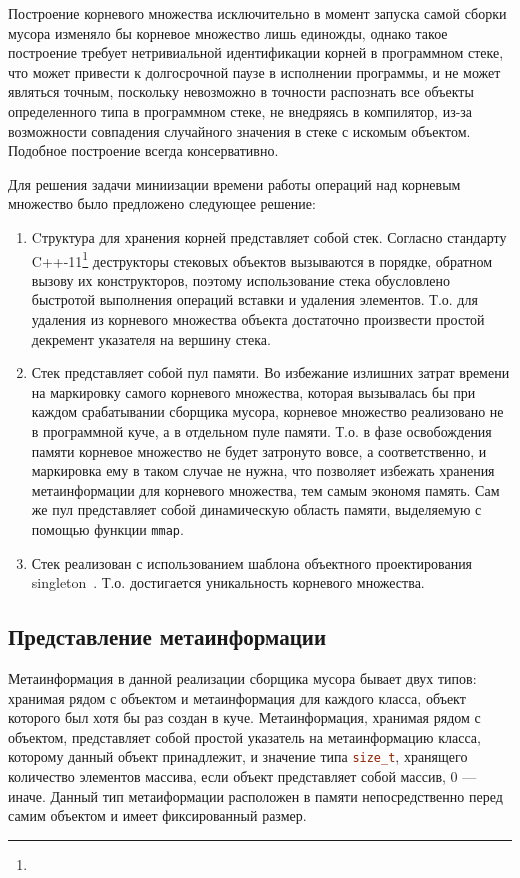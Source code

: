 Построение корневого множества исключительно в момент запуска самой сборки мусора
изменяло бы корневое множество лишь единожды, однако такое построение требует нетривиальной идентификации корней
в программном стеке, что может привести к долгосрочной паузе в исполнении программы, и не может являться
точным, поскольку невозможно в точности распознать все объекты определенного типа в программном стеке, не
внедряясь в компилятор, из-за возможности совпадения случайного значения в стеке с искомым объектом. Подобное
построение всегда консервативно.

Для решения задачи миниизации времени работы операций над корневым множество было предложено следующее решение:
\begin{enumerate}
\item Cтруктура для хранения корней представляет собой стек.
Согласно стандарту C++-11\footnote{} деструкторы стековых объектов вызываются в порядке, обратном вызову
их конструкторов, поэтому использование стека обусловлено быстротой выполнения операций вставки и удаления элементов.
Т.о. для удаления из корневого множества объекта достаточно произвести простой декремент указателя на вершину стека.
\item Стек представляет собой пул памяти.
Во избежание излишних затрат времени на маркировку самого корневого множества, которая вызывалась бы при каждом срабатывании
сборщика мусора, корневое множество реализовано не в программной куче, а в отдельном пуле памяти. Т.о. в фазе освобождения
памяти корневое множество не будет затронуто вовсе, а соответственно, и маркировка ему в таком случае не нужна,
что позволяет избежать хранения метаинформации для корневого множества, тем самым экономя память.
Сам же пул представляет собой динамическую область памяти, выделяемую с помощью функции \lstinline[language= cpp]{mmap}.
\item Стек реализован с использованием шаблона объектного проектирования singleton~\cite{patterns}.
Т.о. достигается уникальность корневого множества.
\end{enumerate} 

\subsection{Представление метаинформации}
Метаинформация в данной реализации сборщика мусора бывает двух типов: хранимая рядом с объектом и метаинформация для каждого класса, объект которого был хотя бы раз создан в куче.
Метаинформация, хранимая рядом с объектом, представляет собой простой указатель на метаинформацию класса,
которому данный объект принадлежит, и значение типа \lstinline[language= cpp]{size_t},
хранящего количество элементов массива, если объект представляет собой массив, 0 --- иначе.
Данный тип метаиформации расположен в памяти непосредственно перед самим объектом и имеет фиксированный размер.

